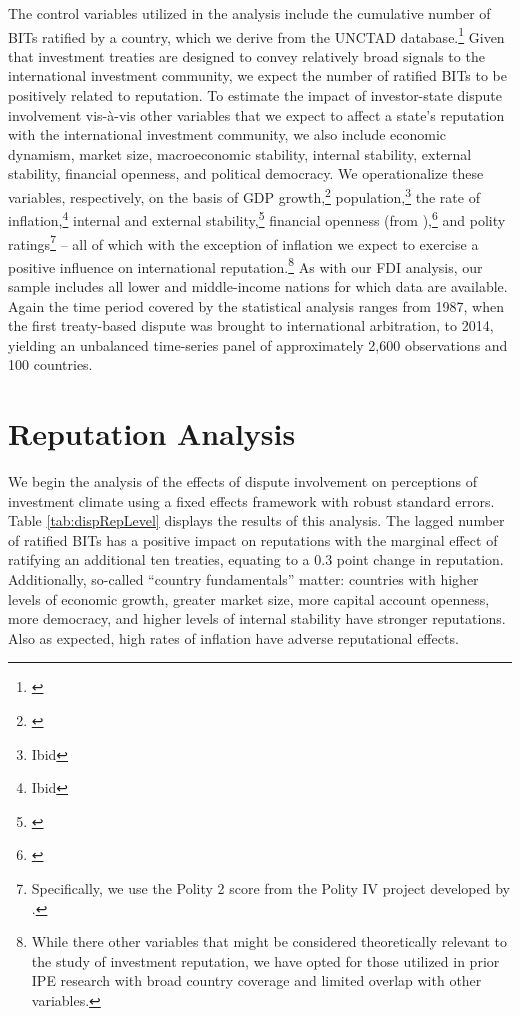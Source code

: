 \documentclass[12pt,onesided]{amsart}
\begin{document}
 The control variables utilized in the analysis include the cumulative number of BITs ratified by a country, which we derive from the UNCTAD database.\footnote{\citet{unctad:2013c}} Given that investment treaties are designed to convey relatively broad signals to the international investment community, we expect the number of ratified BITs to be positively related to reputation. To estimate the impact of investor-state dispute involvement vis-\`{a}-vis other variables that we expect to affect a state's reputation with the international investment community, we also include economic dynamism, market size, macroeconomic stability, internal stability, external stability, financial openness, and political democracy. We operationalize these variables, respectively, on the basis of GDP growth,\footnote{\citet{worldbank:2013}} population,\footnote{Ibid} the rate of inflation,\footnote{Ibid} internal and external stability,\footnote{\citet{prs:2013}} financial openness (from \citeauthor{chinn:ito:2008}),\footnote{\citet{chinn:ito:2008}} and polity ratings\footnote{Specifically, we use the Polity 2 score from the Polity IV project developed by \citet{marshall2013polity}.} -- all of which with the exception of inflation we expect to exercise a positive influence on international reputation.\footnote{While there other variables that might be considered theoretically relevant to the study of investment reputation, we have opted for those utilized in prior IPE research with broad country coverage and limited overlap with other variables.} As with our FDI analysis, our sample includes all lower and middle-income nations for which data are available. Again the time period covered by the statistical analysis ranges from 1987, when the first treaty-based dispute was brought to international arbitration, to 2014, yielding an unbalanced time-series panel of approximately 2,600 observations and 100 countries.

\section*{Reputation Analysis}

We begin the analysis of the effects of dispute involvement on perceptions of investment climate using a fixed effects framework with robust standard errors. Table \ref{tab:dispRepLevel} displays the results of this analysis. The lagged number of ratified BITs has a positive impact on reputations with the marginal effect of ratifying an additional ten treaties, equating to a 0.3 point change in reputation. Additionally, so-called ``country fundamentals'' matter: countries with higher levels of economic growth, greater market size, more capital account openness, more democracy, and higher levels of internal stability have stronger reputations. Also as expected, high rates of inflation have adverse reputational effects.
\end{document}
